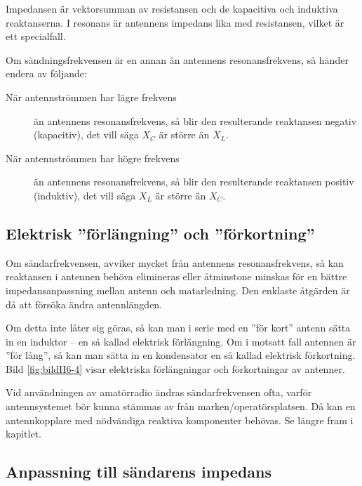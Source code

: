 Impedansen är vektorsumman av resistansen och de kapacitiva och
induktiva reaktanserna.
I resonans är antennens impedans lika med resistansen, vilket är ett
specialfall.

Om sändningsfrekvensen är en annan än antennens resonansfrekvens, så händer
endera av följande:

\begin{description}
\item[När antennströmmen har lägre frekvens] än antennens resonansfrekvens, så blir
den resulterande reaktansen negativ (kapacitiv), det vill säga \(X_C\) är större
än \(X_L\).

\item[När antennströmmen har högre frekvens] än antennens resonansfrekvens,
så blir den resulterande reaktansen positiv (induktiv), det vill säga \(X_L\)
är större än \(X_C\).
\end{description}


\subsection{Elektrisk ''förlängning'' och ''förkortning''}
\label{elektrisk förlängning}

Om sändarfrekvensen, avviker mycket från antennens resonansfrekvens,
så kan reaktansen i antennen behöva elimineras eller åtminstone
minskas för en bättre impedansanpassning mellan antenn och matarledning.
Den enklaste åtgärden är då att försöka ändra antennlängden.

Om detta inte låter sig göras, så kan man i serie med en ''för kort''
antenn sätta in en induktor -- en så kallad elektrisk förlängning.
Om i motsatt fall antennen är ''för lång'', så kan man sätta in en
kondensator en så kallad elektrisk förkortning.
Bild \ref{fig:bildII6-4} visar elektriska förlängningar och förkortningar av
antenner.

Vid användningen av amatörradio ändras sändarfrekvensen ofta, varför
antennsystemet bör kunna stämmas av från marken/operatörsplatsen.
Då kan en antennkopplare med nödvändiga reaktiva komponenter behövas.
Se längre fram i kapitlet.

\subsection{Anpassning till sändarens impedans}
\label{antenner_ståendevåg}

